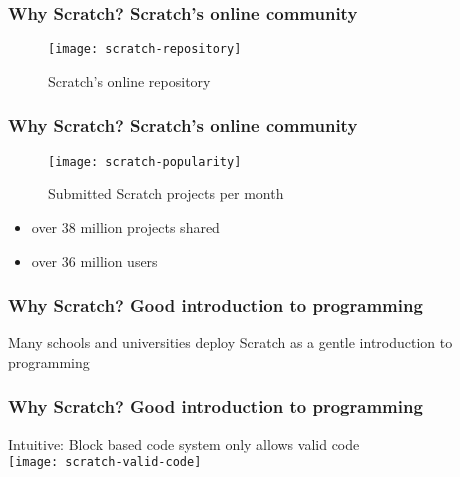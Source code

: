 \begin{frame}
\end{frame}

\begin{frame}
\end{frame}

\begin{frame}\frametitle{Why Scratch? Scratch's online community}
    \begin{figure}
        \texttt{[image: scratch-repository]}
        \caption{Scratch's online repository}
    \end{figure}
\end{frame}

\begin{frame}[shrink=0]\frametitle{Why Scratch? Scratch's online community}
    \begin{figure}
        \texttt{[image: scratch-popularity]}
        \caption{Submitted Scratch projects per month}
    \end{figure}
    \centering
    \begin{minipage}{.7\textwidth}
        \begin{itemize}
            \item over 38 million projects shared
            \item over 36 million users
        \end{itemize}
    \end{minipage}
\end{frame}

\begin{frame}\frametitle{Why Scratch? Good introduction to programming}
    Many schools and universities deploy Scratch as a gentle introduction to programming
\end{frame}

\begin{frame}\frametitle{Why Scratch? Good introduction to programming}
    \centering
    Intuitive: Block based code system only allows valid code\\[\medskipamount]
    \texttt{[image: scratch-valid-code]}
\end{frame}

